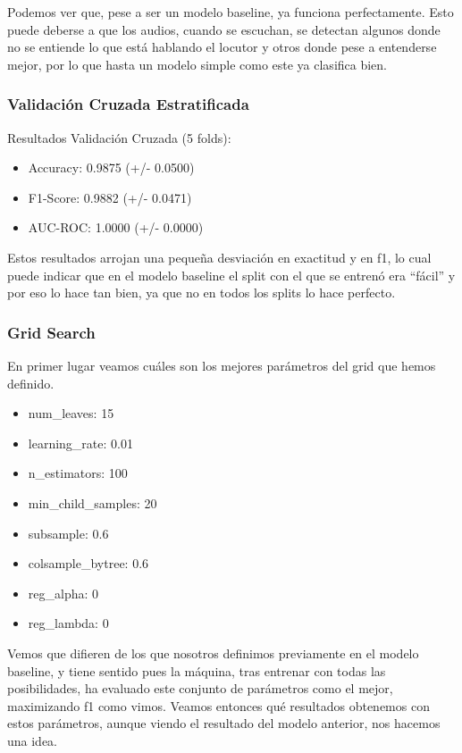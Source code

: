 Podemos ver que, pese a ser un modelo baseline, ya funciona perfectamente. Esto puede deberse a que los audios, cuando se escuchan, se detectan algunos donde no se entiende lo que está hablando el locutor y otros donde pese a entenderse mejor, por lo que hasta un modelo simple como este ya clasifica bien.

\subsubsection*{Validación Cruzada Estratificada}

Resultados Validación Cruzada (5 folds):
\begin{itemize}
	\item Accuracy: 0.9875 (+/- 0.0500)
	\item F1-Score: 0.9882 (+/- 0.0471)
	\item AUC-ROC:  1.0000 (+/- 0.0000)
\end{itemize}
   
Estos resultados arrojan una pequeña desviación en exactitud y en f1, lo cual puede indicar que en el modelo baseline el split con el que se entrenó era ``fácil'' y por eso lo hace tan bien, ya que no en todos los splits lo hace perfecto.

\subsubsection*{Grid Search}

En primer lugar veamos cuáles son los mejores parámetros del grid que hemos definido.

\begin{itemize}
	\item num\_leaves: 15
	\item learning\_rate: 0.01
	\item n\_estimators: 100
	\item min\_child\_samples: 20
	\item subsample: 0.6
	\item colsample\_bytree: 0.6
	\item reg\_alpha: 0
	\item reg\_lambda: 0
\end{itemize}

Vemos que difieren de los que nosotros definimos previamente en el modelo baseline, y tiene sentido pues la máquina, tras entrenar con todas las posibilidades, ha evaluado este conjunto de parámetros como el mejor, maximizando f1 como vimos. Veamos entonces qué resultados obtenemos con estos parámetros, aunque viendo el resultado del modelo anterior, nos hacemos una idea.

